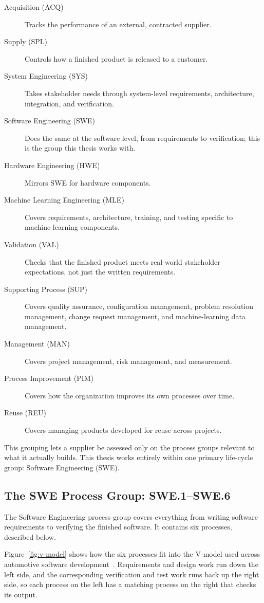 \documentclass[a4paper, 12pt, oneside, openany, BCOR1cm,toc=chapterentrywithdots]{scrbook}
\begin{document}
\begin{description}
  \item[Acquisition (ACQ)] Tracks the performance of an external, contracted supplier.
  \item[Supply (SPL)] Controls how a finished product is released to a customer.
  \item[System Engineering (SYS)] Takes stakeholder needs through system-level requirements,
  architecture, integration, and verification.
  \item[Software Engineering (SWE)] Does the same at the software level, from requirements to
  verification; this is the group this thesis works with.
  \item[Hardware Engineering (HWE)] Mirrors SWE for hardware components.
  \item[Machine Learning Engineering (MLE)] Covers requirements, architecture, training, and
  testing specific to machine-learning components.
  \item[Validation (VAL)] Checks that the finished product meets real-world stakeholder
  expectations, not just the written requirements.
  \item[Supporting Process (SUP)] Covers quality assurance, configuration management, problem
  resolution management, change request management, and machine-learning data management.
  \item[Management (MAN)] Covers project management, risk management, and measurement.
  \item[Process Improvement (PIM)] Covers how the organization improves its own processes over
  time.
  \item[Reuse (REU)] Covers managing products developed for reuse across projects.
\end{description}

This grouping lets a supplier be assessed only on the process groups relevant to what it
actually builds. This thesis works entirely within one primary life-cycle group: Software
Engineering (SWE).

\subsection{The SWE Process Group: SWE.1--SWE.6}

The Software Engineering process group covers everything from writing software requirements to
verifying the finished software. It contains six processes, described below.

Figure~\ref{fig:v-model} shows how the six processes fit into the V-model used across automotive
software development~\cite{vmodel_visure}. Requirements and design work run down the left side,
and the corresponding verification and test work runs back up the right side, so each process on
the left has a matching process on the right that checks its output.
\end{document}
